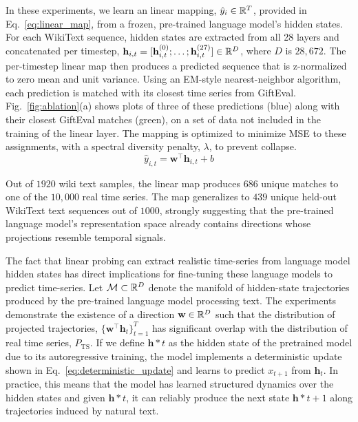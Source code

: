 \label{sec:linear_decoding}
 In these experiments, we learn an linear mapping, $\hat{y}_i \in \mathbb{R}^T$, provided in Eq.~\ref{eq:linear_map}, from a frozen, pre-trained language model's hidden states. For each WikiText sequence, hidden states are extracted from all 28 layers and concatenated per timestep, $\mathbf{h}_{i,t} = [\mathbf{h}_{i,t}^{(0)}; \ldots; \mathbf{h}_{i,t}^{(27)}] \in \mathbb{R}^{D}$, where $D$ is $28{,}672$. The per-timestep linear map then produces a predicted sequence that is z-normalized to zero mean and unit variance. Using an EM-style nearest-neighbor algorithm, each prediction is matched with its closest time series from GiftEval. Fig.~\ref{fig:ablation}(a) shows plots of three of these predictions (blue) along with their closest GiftEval matches (green), on a set of data not included in the training of the linear layer. The mapping is optimized to minimize MSE to these assignments, with a spectral diversity penalty, $\lambda$, to prevent collapse.
  \begin{equation}
 \label{eq:linear_map}
     \hat{y}_{i,t} = \mathbf{w}^\top \mathbf{h}_{i,t} + b
 \end{equation}
  
Out of $1920$ wiki text samples, the linear map produces $686$ unique matches to one of the $10{,}000$ real time series. The map generalizes to $439$ unique held-out WikiText text sequences out of $1000$, strongly suggesting that the pre-trained language model's representation space already contains directions whose projections resemble temporal signals.
 
The fact that linear probing can extract realistic time-series from language model hidden states has direct implications for fine-tuning these language models to predict time-series. Let $\mathcal{M} \subset \mathbb{R}^D$ denote the manifold of hidden-state trajectories produced by the pre-trained language model processing text. The experiments demonstrate the existence of a direction $\mathbf{w} \in \mathbb{R}^D$ such that the distribution of projected trajectories, $\{\mathbf{w}^\top \mathbf{h}_t\}_{t=1}^T$ has significant overlap with the distribution of real time series, $P_{\mathrm{TS}}$. If we define $\mathbf{h}*t$ as the hidden state of the pretrained model %
due to its autoregressive training, the model implements a deterministic update shown in Eq.~\ref{eq:deterministic_update} and learns to predict $x_{t+1}$ from $\mathbf{h}_t$. In practice, this means that the model has learned structured dynamics over the hidden states and given $\mathbf{h}*t$, it can reliably produce the next state $\mathbf{h}*{t+1}$ along trajectories induced by natural text.

